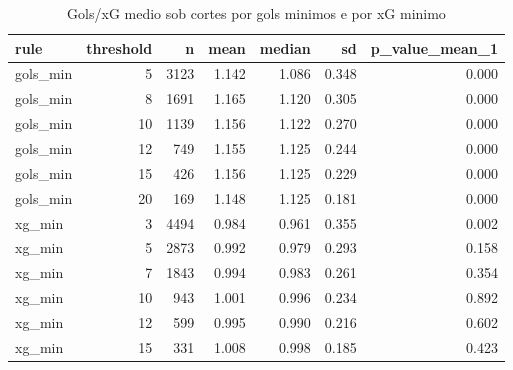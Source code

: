 \begin{table}

\caption{\label{tab:cortes_comparacao}Gols/xG medio sob cortes por gols minimos e por xG minimo}
\centering
\begin{tabular}[t]{lrrrrrr}
\toprule
rule & threshold & n & mean & median & sd & p\_value\_mean\_1\\
\midrule
gols\_min & 5 & 3123 & 1.142 & 1.086 & 0.348 & 0.000\\
gols\_min & 8 & 1691 & 1.165 & 1.120 & 0.305 & 0.000\\
gols\_min & 10 & 1139 & 1.156 & 1.122 & 0.270 & 0.000\\
gols\_min & 12 & 749 & 1.155 & 1.125 & 0.244 & 0.000\\
gols\_min & 15 & 426 & 1.156 & 1.125 & 0.229 & 0.000\\
\addlinespace
gols\_min & 20 & 169 & 1.148 & 1.125 & 0.181 & 0.000\\
xg\_min & 3 & 4494 & 0.984 & 0.961 & 0.355 & 0.002\\
xg\_min & 5 & 2873 & 0.992 & 0.979 & 0.293 & 0.158\\
xg\_min & 7 & 1843 & 0.994 & 0.983 & 0.261 & 0.354\\
xg\_min & 10 & 943 & 1.001 & 0.996 & 0.234 & 0.892\\
\addlinespace
xg\_min & 12 & 599 & 0.995 & 0.990 & 0.216 & 0.602\\
xg\_min & 15 & 331 & 1.008 & 0.998 & 0.185 & 0.423\\
\bottomrule
\end{tabular}
\end{table}
